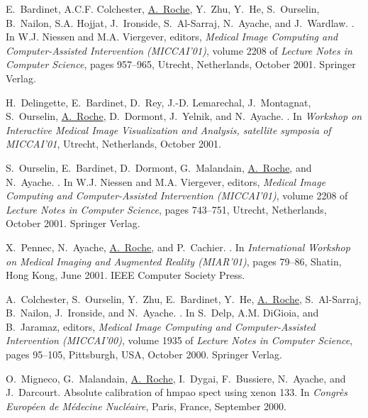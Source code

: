 \begin{thebibliography}{100}
E.~Bardinet, A.C.F. Colchester, \underline{A.~Roche}, Y.~Zhu, Y.~He, S.~Ourselin,
  B.~Nailon, S.A. Hojjat, J.~Ironside, S.~Al-Sarraj, N.~Ayache, and J.~Wardlaw.
.
\newblock In W.J. Niessen and M.A. Viergever, editors, {\em Medical Image
  Computing and Computer-Assisted Intervention (MICCAI'01)}, volume 2208 of
  {\em Lecture Notes in Computer Science}, pages 957--965, Utrecht,
  Netherlands, October 2001. Springer Verlag.

H.~Delingette, E.~Bardinet, D.~Rey, J.-D. Lemarechal, J.~Montagnat,
  S.~Ourselin, \underline{A.~Roche}, D.~Dormont, J.~Yelnik, and N.~Ayache.
.
\newblock In {\em Workshop on Interactive Medical Image Visualization and
  Analysis, satellite symposia of MICCAI'01}, Utrecht, Netherlands, October
  2001.

S.~Ourselin, E.~Bardinet, D.~Dormont, G.~Malandain, \underline{A.~Roche}, and N.~Ayache.
.
\newblock In W.J. Niessen and M.A. Viergever, editors, {\em Medical Image
  Computing and Computer-Assisted Intervention (MICCAI'01)}, volume 2208 of
  {\em Lecture Notes in Computer Science}, pages 743--751, Utrecht,
  Netherlands, October 2001. Springer Verlag.

X.~Pennec, N.~Ayache, \underline{A.~Roche}, and P.~Cachier.
.
\newblock In {\em International Workshop on Medical Imaging and Augmented
  Reality (MIAR'01)}, pages 79--86, Shatin, Hong Kong, June 2001. IEEE Computer
  Society Press.

A.~Colchester, S.~Ourselin, Y.~Zhu, E.~Bardinet, Y.~He, \underline{A.~Roche}, S.~Al-Sarraj,
  B.~Nailon, J.~Ironside, and N.~Ayache.
.
\newblock In S.~Delp, A.M. DiGioia, and B.~Jaramaz, editors, {\em Medical Image
  Computing and Computer-Assisted Intervention (MICCAI'00)}, volume 1935 of
  {\em Lecture Notes in Computer Science}, pages 95--105, Pittsburgh, USA,
  October 2000. Springer Verlag.

O.~Migneco, G.~Malandain, \underline{A.~Roche}, I.~Dygai, F.~Bussiere, N.~Ayache, and
  J.~Darcourt.
\newblock Absolute calibration of hmpao spect using xenon 133.
\newblock In {\em Congr\`es Europ\'een de M\'edecine Nucl\'eaire}, Paris,
  France, September 2000.


\end{thebibliography}
